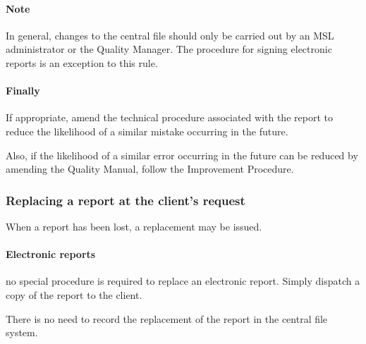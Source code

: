 \paragraph{Note} In general, changes to the central file should only be carried out by an MSL administrator or the Quality Manager. The procedure for signing electronic reports is an exception to this rule. 

\paragraph{Finally} If appropriate, amend the technical procedure associated with the report to reduce the likelihood of a similar mistake occurring in the future.

Also, if the likelihood of a similar error occurring in the future can be reduced by amending the Quality Manual, follow the Improvement Procedure.  




\subsubsection{Replacing a report at the client's request}
When a report has been lost, a replacement may be issued. 

\paragraph{Electronic reports} no special procedure is required to replace an electronic report. Simply dispatch a copy of the report to the client.

There is no need to record the replacement of the report in the central file system.



